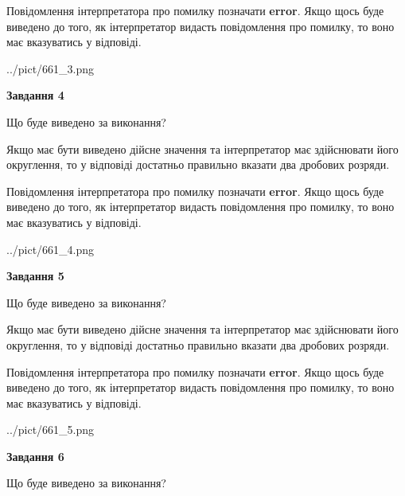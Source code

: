 \documentclass[12pt, ukrainian]{article}
\begin{document}
{\begin {Large}
Повідомлення інтерпретатора про помилку позначати \textbf{error}.
Якщо щось буде виведено до того, як інтерпретатор видасть повідомлення про помилку, 
то воно має вказуватись у відповіді. \par

\begin{center}
	{../pict/661_3.png}
\end{center}
\newpage

{\begin {center}\textbf{Завдання 4}\end {center}}\par
Що буде виведено за виконання? \par

Якщо має бути виведено дійсне значення та інтерпретатор має здійснювати його округлення, 
то у відповіді достатньо правильно вказати два дробових розряди.

Повідомлення інтерпретатора про помилку позначати \textbf{error}.
Якщо щось буде виведено до того, як інтерпретатор видасть повідомлення про помилку, 
то воно має вказуватись у відповіді. \par

\begin{center}
	{../pict/661_4.png}
\end{center}
\newpage

{\begin {center}\textbf{Завдання 5}\end {center}}\par
Що буде виведено за виконання? \par

Якщо має бути виведено дійсне значення та інтерпретатор має здійснювати його округлення, 
то у відповіді достатньо правильно вказати два дробових розряди.

Повідомлення інтерпретатора про помилку позначати \textbf{error}.
Якщо щось буде виведено до того, як інтерпретатор видасть повідомлення про помилку, 
то воно має вказуватись у відповіді. \par

\begin{center}
	{../pict/661_5.png}
\end{center}
\newpage

{\begin {center}\textbf{Завдання 6}\end {center}}\par
Що буде виведено за виконання? \par


\end{Large}}
\end{document}
